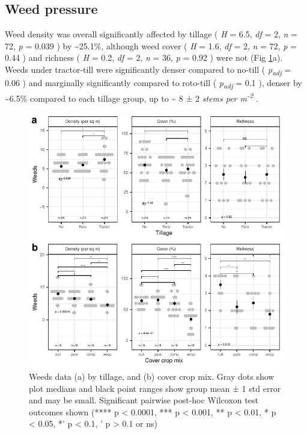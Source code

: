 \documentclass[
  12pt,
]{article}
\begin{document}
\hypertarget{weed-pressure}{%
\subsection{Weed pressure}\label{weed-pressure}}

Weed density was overall significantly affected by tillage (
\emph{H} = 6.5,
\emph{df} = 2,
\emph{n} = 72,
\emph{p} = 0.039
) by
\textasciitilde25.1\%,
although weed cover (
\emph{H} = 1.6,
\emph{df} = 2,
\emph{n} = 72,
\emph{p} = 0.44
) and richness (
\emph{H} = 0.2,
\emph{df} = 2,
\emph{n} = 36,
\emph{p} = 0.92
) were not
(Fig \ref{fig:weedsFig}a).
Weeds under tractor-till were significantly denser compared to no-till (
\emph{p\textsubscript{adj}} = 0.06
) and marginally significantly compared to roto-till (
\emph{p\textsubscript{adj}} = 0.1
), denser by
\textasciitilde6.5\%
compared to each tillage group,
up to
\textasciitilde{} 8 ±
2 \emph{stems per m\textsuperscript{-2}}
.

\begin{figure}
\centering
\includegraphics{merge_files/figure-latex/weedsFig-1.pdf}
\caption{\label{fig:weedsFig}Weeds data (a) by tillage, and (b) cover crop mix. Gray dots show plot medians and black point ranges show group mean ± 1 std error and may be small. Significant pairwise post-hoc Wilcoxon test outcomes shown (**** p \textless{} 0.0001, *** p \textless{} 0.001, ** p \textless{} 0.01, * p \textless{} 0.05, *' p \textless{} 0.1, ' p \textgreater{} 0.1 or ns)}
\end{figure}
\end{document}
